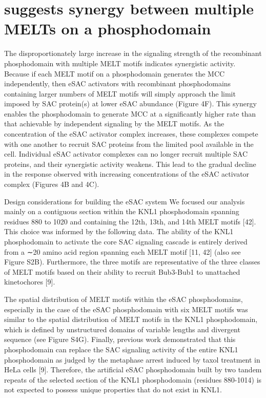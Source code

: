 \section{suggests synergy between multiple MELTs on a  phosphodomain}

The disproportionately large increase in the signaling strength of the recombinant  phosphodomain with multiple MELT motifs indicates synergistic activity. Because if each MELT motif on a  phosphodomain generates the MCC independently, then eSAC activators with recombinant phosphodomains containing larger numbers of MELT motifs will simply approach the limit imposed by SAC protein(s) at lower eSAC abundance (Figure 4F). This synergy enables the phosphodomain to generate MCC at a significantly higher rate than that achievable by independent signaling by the MELT motifs. As the concentration of the eSAC activator complex increases, these complexes compete with one another to recruit SAC proteins from the limited pool available in the cell. Individual eSAC activator complexes can no longer recruit multiple SAC proteins, and their synergistic activity weakens. This lead to the gradual decline in the response observed with increasing concentrations of the eSAC activator complex (Figures 4B and 4C).



Design considerations for building the eSAC system
We focused our analysis mainly on a contiguous section within the KNL1 phosphodomain spanning residues 880 to 1020 and containing the 12th, 13th, and 14th MELT motifs [42]. This choice was informed by the following data. The ability of the KNL1 phosphodomain to activate the core SAC signaling cascade is entirely derived from a ∼20 amino acid region spanning each MELT motif [11, 42] (also see Figure S2B). Furthermore, the three motifs are representative of the three classes of MELT motifs based on their ability to recruit Bub3-Bub1 to unattached kinetochores [9].

The spatial distribution of MELT motifs within the eSAC phosphodomains, especially in the case of the eSAC phosphodomain with six MELT motifs was similar to the spatial distribution of MELT motifs in the KNL1 phosphodomain, which is defined by unstructured domains of variable lengths and divergent sequence (see Figure S4G). Finally, previous work demonstrated that this phosphodomain can replace the SAC signaling activity of the entire KNL1 phosphodomain as judged by the metaphase arrest induced by taxol treatment in HeLa cells [9]. Therefore, the artificial eSAC phosphodomain built by two tandem repeats of the selected section of the KNL1 phosphodomain (residues 880-1014) is not expected to possess unique properties that do not exist in KNL1.